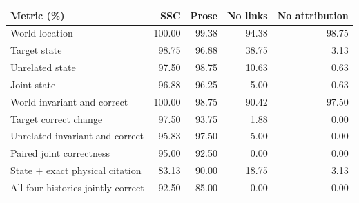 \begin{tabular}{lrrrr}
\toprule
Metric (\%) & SSC & Prose & No links & No attribution \\
\midrule
World location & 100.00 & 99.38 & 94.38 & 98.75 \\
Target state & 98.75 & 96.88 & 38.75 & 3.13 \\
Unrelated state & 97.50 & 98.75 & 10.63 & 0.63 \\
Joint state & 96.88 & 96.25 & 5.00 & 0.63 \\
World invariant and correct & 100.00 & 98.75 & 90.42 & 97.50 \\
Target correct change & 97.50 & 93.75 & 1.88 & 0.00 \\
Unrelated invariant and correct & 95.83 & 97.50 & 5.00 & 0.00 \\
Paired joint correctness & 95.00 & 92.50 & 0.00 & 0.00 \\
State + exact physical citation & 83.13 & 90.00 & 18.75 & 3.13 \\
All four histories jointly correct & 92.50 & 85.00 & 0.00 & 0.00 \\
\bottomrule
\end{tabular}
